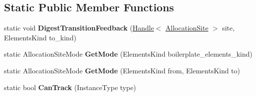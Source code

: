\subsection*{Static Public Member Functions}
\begin{DoxyCompactItemize}
\item 
static void {\bfseries Digest\+Transition\+Feedback} (\hyperlink{classv8_1_1internal_1_1_handle}{Handle}$<$ \hyperlink{classv8_1_1internal_1_1_allocation_site}{Allocation\+Site} $>$ site, Elements\+Kind to\+\_\+kind)\hypertarget{classv8_1_1internal_1_1_allocation_site_a0bfecad8387c5d8ce19551d9ec7326ce}{}\label{classv8_1_1internal_1_1_allocation_site_a0bfecad8387c5d8ce19551d9ec7326ce}

\item 
static Allocation\+Site\+Mode {\bfseries Get\+Mode} (Elements\+Kind boilerplate\+\_\+elements\+\_\+kind)\hypertarget{classv8_1_1internal_1_1_allocation_site_a6ac30d18f89c9a43eaff3ca894671851}{}\label{classv8_1_1internal_1_1_allocation_site_a6ac30d18f89c9a43eaff3ca894671851}

\item 
static Allocation\+Site\+Mode {\bfseries Get\+Mode} (Elements\+Kind from, Elements\+Kind to)\hypertarget{classv8_1_1internal_1_1_allocation_site_a4c5f330f48db33d18eaa5346fd89130c}{}\label{classv8_1_1internal_1_1_allocation_site_a4c5f330f48db33d18eaa5346fd89130c}

\item 
static bool {\bfseries Can\+Track} (Instance\+Type type)\hypertarget{classv8_1_1internal_1_1_allocation_site_a5bce0a6a275e0f9a9c8a3e87babab0d9}{}\label{classv8_1_1internal_1_1_allocation_site_a5bce0a6a275e0f9a9c8a3e87babab0d9}

\end{DoxyCompactItemize}
